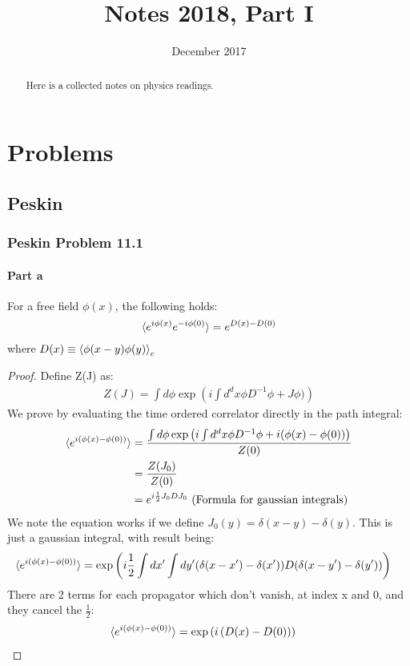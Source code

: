 \documentclass[10pt]{scrartcl}
\begin{document}
\title{Notes 2018, Part I} %
\date{December 2017}
\maketitle

\begin{abstract}
	\sffamily\small
	Here is a collected notes on physics readings.
\end{abstract}

\vspace{1em}
\tableofcontents
\newpage


\section{Problems}

\subsection{Peskin}
\subsubsection{Peskin Problem 11.1}

\paragraph{Part a}
\begin{lemma}
For a free field $\phi(x)$, the following holds:
$$\braket{ e^{i \phi(x)} e^{-i \phi(0)}} = e^{D(x)-D(0)}$$
where $ D(x) \equiv \braket{\phi(x-y) \phi(y)}_c$
\end{lemma}

\begin{proof}
Define Z(J) as:
\begin{align}
Z(J) = \int d \phi \exp\left(i \int d^d x \phi D^{-1} \phi + J \phi) \right)
\end{align}
We prove by evaluating the time ordered correlator directly in the path integral:
\begin{align}
\braket{e^{i (\phi(x)- \phi(0))}} & = {\int d \phi \exp\left(i \int d^d x \phi D^{-1} \phi + i (\phi(x)- \phi(0)) \right) \over Z(0)} \\
 & = {Z(J_0) \over Z(0)} \\
 & = e^{i\frac12 J_0 D J_0} \text{ (Formula for gaussian integrals)}
\end{align}
We note the equation works if we define $J_0(y) = \delta(x-y)- \delta(y)$.
This is just a gaussian integral, with result being:
\begin{align}
\braket{e^{i (\phi(x)- \phi(0))}} &= \exp \left(i \frac12  \int dx' \int dy' (\delta(x-x')-\delta(x')) D (\delta(x-y') -\delta(y'))\right) 
\end{align}
There are 2 terms for each propagator which don't vanish, at index x and 0, and they cancel the $\frac12$:
\begin{align}
\braket{e^{i (\phi(x)- \phi(0))}} &= \exp \left(i \left( D(x)- D(0) \right) \right) 
\end{align}
\end{proof}
\end{document}
